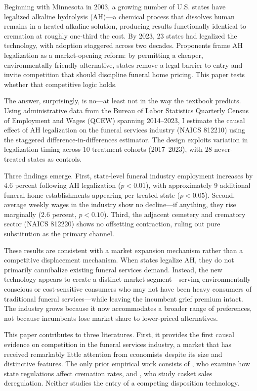 \documentclass[12pt]{article}
\begin{document}
Beginning with Minnesota in 2003, a growing number of U.S. states have legalized alkaline hydrolysis (AH)---a chemical process that dissolves human remains in a heated alkaline solution, producing results functionally identical to cremation at roughly one-third the cost. By 2023, 23 states had legalized the technology, with adoption staggered across two decades. Proponents frame AH legalization as a market-opening reform: by permitting a cheaper, environmentally friendly alternative, states remove a legal barrier to entry and invite competition that should discipline funeral home pricing. This paper tests whether that competitive logic holds.

The answer, surprisingly, is no---at least not in the way the textbook predicts. Using administrative data from the Bureau of Labor Statistics Quarterly Census of Employment and Wages (QCEW) spanning 2014--2023, I estimate the causal effect of AH legalization on the funeral services industry (NAICS 812210) using the \citet{callaway2021difference} staggered difference-in-differences estimator. The design exploits variation in legalization timing across 10 treatment cohorts (2017--2023), with 28 never-treated states as controls.

Three findings emerge. First, state-level funeral industry employment increases by 4.6 percent following AH legalization ($p < 0.01$), with approximately 9 additional funeral home establishments appearing per treated state ($p < 0.05$). Second, average weekly wages in the industry show no decline---if anything, they rise marginally (2.6 percent, $p < 0.10$). Third, the adjacent cemetery and crematory sector (NAICS 812220) shows no offsetting contraction, ruling out pure substitution as the primary channel.

These results are consistent with a market expansion mechanism rather than a competitive displacement mechanism. When states legalize AH, they do not primarily cannibalize existing funeral services demand. Instead, the new technology appears to create a distinct market segment---serving environmentally conscious or cost-sensitive consumers who may not have been heavy consumers of traditional funeral services---while leaving the incumbent grief premium intact. The industry grows because it now accommodates a broader range of preferences, not because incumbents lose market share to lower-priced alternatives.

This paper contributes to three literatures. First, it provides the first causal evidence on competition in the funeral services industry, a market that has received remarkably little attention from economists despite its size and distinctive features. The only prior empirical work consists of \citet{harrington2002funeral}, who examine how state regulations affect cremation rates, and \citet{chevalier2020price}, who study casket sales deregulation. Neither studies the entry of a competing disposition technology.
\end{document}
